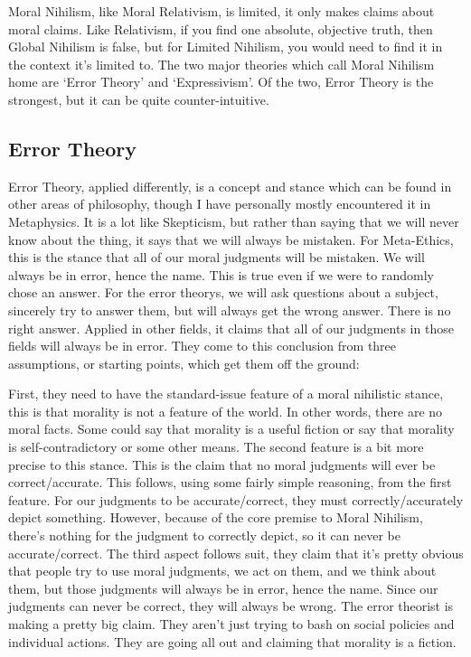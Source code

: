 Moral Nihilism, like Moral Relativism, is limited, it only makes claims about moral claims. Like Relativism, if you find one absolute, objective truth, then Global Nihilism is false, but for Limited Nihilism, you would need to find it in the context it's limited to. The two major theories which call Moral Nihilism home are `Error Theory' and `Expressivism'. Of the two, Error Theory is the strongest, but it can be quite counter-intuitive. 

\subsection{Error Theory}

Error Theory, applied differently, is a concept and stance which can be found in other areas of philosophy, though I have personally mostly encountered it in Metaphysics. It is a lot like Skepticism, but rather than saying that we will never know about the thing, it says that we will always be mistaken.  For Meta-Ethics, this is the stance that all of our moral judgments will be mistaken. We will always be in error, hence the name. This is true even if we were to randomly chose an answer. For the \glspl{error theory}, we will ask questions about a subject, sincerely try to answer them, but will always get the wrong answer. There is no right answer.  Applied in other fields, it claims that all of our judgments in those fields will always be in error. They come to this conclusion from three assumptions, or starting points, which get them off the ground:

First, they need to have the standard-issue feature of a moral nihilistic stance, this is that morality is not a feature of the world. In other words, there are no moral facts. Some could say that morality is a useful fiction or say that morality is self-contradictory or some other means. The second feature is a bit more precise to this stance. This is the claim that no moral judgments will ever be correct/accurate.  This follows, using some fairly simple reasoning, from the first feature. For our judgments to be accurate/correct, they must correctly/accurately depict something. However, because of the core premise to Moral Nihilism, there's nothing for the judgment to correctly depict, so it can never be accurate/correct. The third aspect follows suit, they claim that it's pretty obvious that people try to use moral judgments, we act on them, and we think about them, but those judgments will always be in error, hence the name. Since our judgments can never be correct, they will always be wrong. The error theorist is making a pretty big claim. They aren’t just trying to bash on social policies and individual actions. They are going all out and claiming that morality is a fiction.

